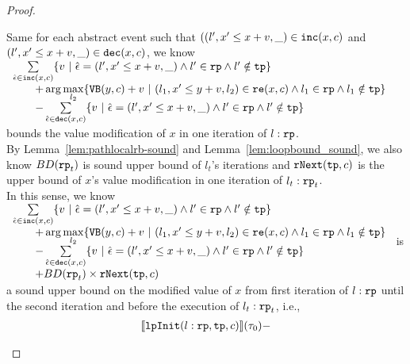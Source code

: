 \begin{proof}
\begin{itemize}
\[    \]
    Same for each abstract event such that $((l', x' \leq x + v, \_) \in \mathtt{inc}(x, c) $ and $(l', x' \leq x + v, \_) \in \mathtt{dec}(x, c)$,
    we know 
    $ \begin{array}{l}
      \sum\limits_{\absevent \in \inc(x, c) }
      \left\{ 
      v ~\middle\vert~ \absevent = (l', x' \leq x + v, \_) \land  l' \in \rprog 
      \land l' \notin \tpath \right\}
      \\ \qquad 
      + \arg\max\limits_{l_2 }
          \left\{ 
            \varinvar(y, c) + v ~\middle\vert~ 
          (l_1, x' \leq y + v, l_2) \in \reset(x, c) \land l_1 \in \rprog \land l_1 \notin \tpath
          \right\}
      \\ \qquad 
      - \sum\limits_{ \absevent \in \dec(x, c) }\left\{ 
      v 
      ~\middle\vert~ \absevent = (l', x' \leq x + v, \_) \land l' \in \rprog \land l' \notin \tpath \right\}
    \end{array}
    $ bounds the value modification of $x$ in one iteration of $l: \mathtt{rp}$.
  \\
  By Lemma~\ref{lem:pathlocalrb-sound} and Lemma~\ref{lem:loopbound_sound}, we also know $BD(\mathtt{rp}_t)$ is sound upper bound of $l_t$'s iterations and $\mathtt{rNext}(\mathtt{tp}, c)$ is the upper bound of $x$'s value modification in one iteration of $l_t: \mathtt{rp}_t$.
  \\
  In this sense, we know
  $\begin{array}{l}
      \sum\limits_{\absevent \in \inc(x, c) }
      \left\{ 
      v ~\middle\vert~ \absevent = (l', x' \leq x + v, \_) \land  l' \in \rprog 
      \land l' \notin \tpath \right\}
      \\ \qquad 
      + \arg\max\limits_{l_2 }
          \left\{ \varinvar(y, c) + v ~\middle\vert~ 
          (l_1, x' \leq y + v, l_2) \in \reset(x, c) \land l_1 \in \rprog \land l_1 \notin \tpath\right\}
      \\ \qquad 
      - \sum\limits_{ \absevent \in \dec(x, c) }\left\{ 
      v 
      ~\middle\vert~ \absevent = (l', x' \leq x + v, \_) \land l' \in \rprog \land l' \notin \tpath \right\}
      \\ \qquad 
      + BD(\rprog_t) \times \rfnext(\tpath, c)
    \end{array}
    $
    is a sound upper bound on the modified value of $x$ from first iteration of $l: \mathtt{rp}$ until the second iteration and before the execution of $l_t: \mathtt{rp}_t$, i.e.,
    \[
      \begin{array}{l}
        \llbracket 
        \mathtt{lpInit}(l: \mathtt{rp}, \mathtt{tp}, c) \rrbracket(\mathtt{\tau}_0)
        -

\end{array}\]
\end{itemize}
\end{proof}
